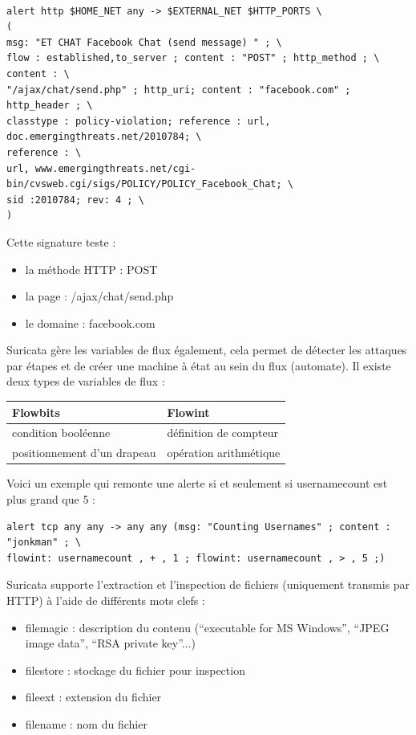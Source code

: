 \documentclass[a4paper,11pt,french]{article}
\begin{document}
\begin{Verbatim}

alert http $HOME_NET any -> $EXTERNAL_NET $HTTP_PORTS \
(
msg: "ET CHAT Facebook Chat (send message) " ; \
flow : established,to_server ; content : "POST" ; http_method ; \
content : \
"/ajax/chat/send.php" ; http_uri; content : "facebook.com" ; http_header ; \
classtype : policy-violation; reference : url, doc.emergingthreats.net/2010784; \
reference : \
url, www.emergingthreats.net/cgi-bin/cvsweb.cgi/sigs/POLICY/POLICY_Facebook_Chat; \
sid :2010784; rev: 4 ; \
)
\end{Verbatim}

Cette signature teste :
\begin{itemize}
\item la méthode HTTP : POST
\item la page : /ajax/chat/send.php
\item le domaine : facebook.com
\end{itemize}

Suricata gère les variables de flux également, cela permet de détecter les attaques par étapes et de créer une machine à état au sein du flux (automate). Il existe deux types de variables de flux :

\begin{center}
\begin{tabularx}{16cm}{|X|X|}
\hline
\textbf{Flowbits}&\textbf{Flowint}\\
\hline
condition booléenne  & définition de compteur\\
positionnement d’un drapeau & opération arithmétique\\
\hline
\end{tabularx}
\end{center}

Voici un exemple qui remonte une alerte si et seulement si usernamecount est plus grand que 5 :
\begin{Verbatim}
alert tcp any any -> any any (msg: "Counting Usernames" ; content : "jonkman" ; \
flowint: usernamecount , + , 1 ; flowint: usernamecount , > , 5 ;)
\end{Verbatim}

Suricata supporte l’extraction et l’inspection de fichiers (uniquement transmis par HTTP) à l’aide de différents mots clefs :
\begin{itemize}
\item filemagic : description du contenu (“executable for MS Windows”, “JPEG image data”, “RSA private key”...)
\item filestore : stockage du fichier pour inspection
\item fileext : extension du fichier
\item filename : nom du fichier
\end{itemize}
\end{document}
